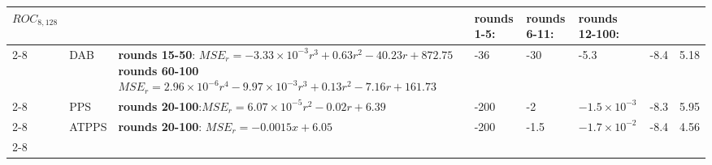 \begin{table}[]
\begin{adjustbox}
\begin{tabular}{|p{0.8cm}|p{1cm}|p{10cm}|p{1.2cm}|p{1.2cm}|p{1.2cm}|p{1cm}|p{1cm}|}
\hline
\multicolumn{1}{|l|}{\multirow{3}{*}{$ROC_{8,128}$}} &  &  & \textbf{rounds 1-5}:& \textbf{rounds 6-11}: & \textbf{rounds 12-100}:  & & \\ \cline{2-8}
\multicolumn{1}{|l|}{} & DAB & \textbf{rounds 15-50}: $MSE_r=-3.33\times 10^{-3}r^{3}+0.63r^{2}-40.23r+872.75$ \textbf{rounds 60-100} $MSE_r=2.96 \times 10^{-6}r^{4}-9.97\times 10^{-3}r^{3}+0.13r^{2}-7.16r+161.73$& -36& -30 &-5.3 & -8.4  & 5.18 \\ \cline{2-8} 
\multicolumn{1}{|l|}{} & PPS & \textbf{rounds 20-100}:$MSE_r=6.07\times 10^{-5}r^{2}-0.02r+6.39$ & -200 & -2 & $-1.5 \times 10^{-3}$ & -8.3 & 5.95 \\ \cline{2-8} 
\multicolumn{1}{|l|}{} & ATPPS & \textbf{rounds 20-100}: $MSE_r=-0.0015x+6.05$ & -200 & -1.5 & $-1.7 \times 10^{-2}$ & -8.4 & 4.56\\ \cline{2-8}
\hline 
\end{tabular}
\end{adjustbox}
\end{table}